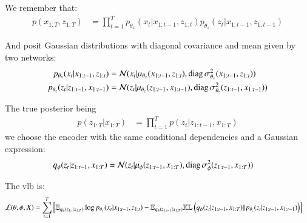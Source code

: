 We remember that:
\begin{align*}
    p(x_{1:T}, z_{1:T}) &= \prod_{t=1}^T p_{\theta_x}(x_t \vert x_{1:t-1}, z_{1:t}) p_{\theta_z}(z_t \vert x_{1:t-1}, z_{1:t-1})
\end{align*}

And posit Gaussian distributions with diagonal covariance and mean given by two networks:
\begin{align}
    p_{\theta_x}(x_t \vert x_{1:t-1}, z_{1:t}) &= \mathcal{N}( x_t \vert \mu_{\theta_x}(x_{1:t-1}, z_{1:t}), \text{diag}\, \sigma_{\theta_x}^2(x_{1:t-1}, z_{1:t})) \\
    p_{\theta_z}(z_t \vert z_{1:t-1}, x_{1:t-1}) &= \mathcal{N}( z_t \vert \mu_{\theta_z}(z_{1:t-1}, x_{1:t-1}), \text{diag}\, \sigma_{\theta_z}^2(z_{1:t-1}, x_{1:t-1}))
\end{align}

The true posterior being
\begin{align*}
    p(z_{1:T} \vert x_{1:T}) &= \prod_{t=1}^T p(z_t \vert z_{1:t-1}, x_{1:T})
\end{align*}
we choose the encoder with the same conditional dependencies and a Gaussian expression:
\begin{align*}
    q_{\phi}(z_{t} \vert z_{1:t-1}, x_{1:T}) &= \mathcal{N}( z_t \vert \mu_{\phi}(z_{1:t-1}, x_{1:T}), \text{diag}\, \sigma_{\phi}^2(z_{1:t-1}, x_{1:T}))
\end{align*}

The \gls{vlb} is:
\begin{align*}
    \mathcal{L}(\theta, \phi, X) &= \sum_{t=1}^T \left[ \mathbb{E}_{q_{\phi}(z_{1:t} \vert x_{1:T})} \log{p_{\theta_x}(x_t \vert x_{1:t-1}, z_{1:t})} - \mathbb{E}_{q_{\phi}(z_{1:t-1} \vert x_{1:T})} \mathbb{KL}\left( q_{\phi}(z_t \vert z_{1:t-1}, x_{1:T}) \vert\vert p_{\theta_z}(z_t \vert z_{1:t-1}, x_{1:t-1}) \right)
    \right]
\end{align*}

